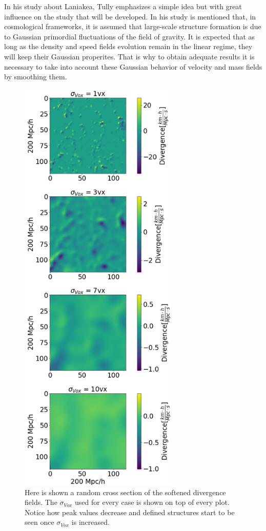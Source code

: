 \documentclass[usenatbib]{mnras}
\begin{document}
In his study about Laniakea, Tully\cite{tully_laniakea_2014} emphasizes a simple idea but with great influence on the study that will be developed. In his study is mentioned that, in cosmological frameworks, it is assumed that large-scale structure formation is due to Gaussian primordial fluctuations of the field of gravity. It is expected that as long as the density and speed fields evolution remain in the linear regime, they will keep their Gaussian properites. That is why to obtain adequate results it is necessary to take into account these Gaussian behavior of velocity and mass fields by smoothing them.

\begin{figure}
    \centering
    \includegraphics[height = 580pt]{grad_fields.pdf}
    \caption{Here is shown  a random cross section of the softened divergence fields. The $\sigma_{Vox}$ used for every case is shown on top of every plot. Notice how peak values decrease and defined structures start to be seen once $\sigma_{Vox}$ is increased.}
    \label{fig:SigmasVDCZcut}
\end{figure}
\end{document}
